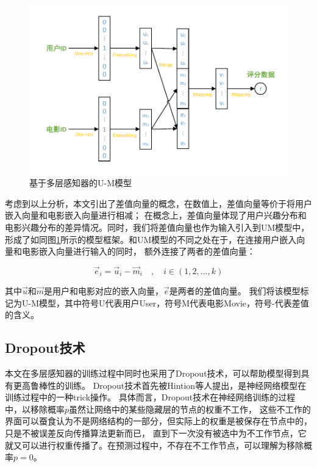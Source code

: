 \begin{figure}[htbp]
\centering
\includegraphics[scale=0.7]{images/a_b_a-b.pdf}
\caption{基于多层感知器的U-M模型}
\label{fig:a_b_a-b}
\end{figure}

考虑到以上分析，本文引出了差值向量的概念，在数值上，差值向量等价于将用户嵌入向量和电影嵌入向量进行相减；
在概念上，差值向量体现了用户兴趣分布和电影兴趣分布的差异情况。同时，我们将差值向量也作为输入引入到UM模型中，
形成了如同图\ref{fig:a_b_a-b}所示的模型框架。和UM模型的不同之处在于，在连接用户嵌入向量和电影嵌入向量进行输入的同时，
额外连接了两者的差值向量：

\begin{equation}
\vec{e}_i = \vec{u}_i - \vec{m}_i \quad , \quad i \in (1,2,...,k)
\end{equation}

其中$\vec{u}$和$\vec{m}$是用户和电影对应的嵌入向量，$\vec{e}$是两者的差值向量。
我们将该模型标记为U-M模型，其中符号U代表用户User，符号M代表电影Movie，符号-代表差值的含义。

\subsection*{Dropout技术}
本文在多层感知器的训练过程中同时也采用了Dropout技术，可以帮助模型得到具有更高鲁棒性的训练。
Dropout技术首先被Hintion等人\parencite{hinton2012improving}提出，是神经网络模型在训练过程中的一种trick操作。
具体而言，Dropout技术在神经网络训练的过程中，以移除概率$p$虽然让网络中的某些隐藏层的节点的权重不工作，
这些不工作的界面可以蚕食认为不是网络结构的一部分，但实际上的权重是被保存在节点中的，只是不被误差反向传播算法更新而已，
直到下一次没有被选中为不工作节点，它就又可以进行权重传播了。在预测过程中，不存在不工作节点，可以理解为移除概率$p=0$。

